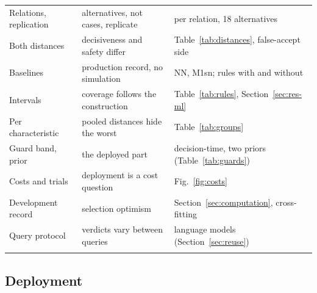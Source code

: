 \documentclass[pdflatex,sn-basic,lineno]{sn-jnl}
\providecommand{\DIFaddendFL}{} %
\DeclareRobustCommand{\DIFaddendFL}{\DIFOaddendFL \let\includegraphics\DIFOincludegraphics} %
\begin{document}
\begin{table}[t]
\begin{tabular}{@{}L{2.7cm}L{4.7cm}L{5.0cm}@{}}
Relations, replication & alternatives, not cases, replicate & per relation, 18 alternatives \\
Both distances & decisiveness and safety differ & Table~\ref{tab:distances}, false-accept side \\
Baselines & production record, no simulation & NN, M1sn; rules with and without \\
Intervals & coverage follows the construction & Table~\ref{tab:rules}, Section~\ref{sec:res-ml} \\
Per characteristic & pooled distances hide the worst & Table~\ref{tab:groups} \\
Guard band, prior & the deployed part & decision-time, two priors (Table~\ref{tab:guards}) \\
Costs and trials & deployment is a cost question & Fig.~\ref{fig:costs} \\
Development record & selection optimism & Section~\ref{sec:computation}, cross-fitting \\
Query protocol & verdicts vary between queries & language models (Section~\ref{sec:reuse}) \\
\botrule
\end{tabular}
\DIFaddendFL \end{table}

\subsection{Deployment}
\end{document}
